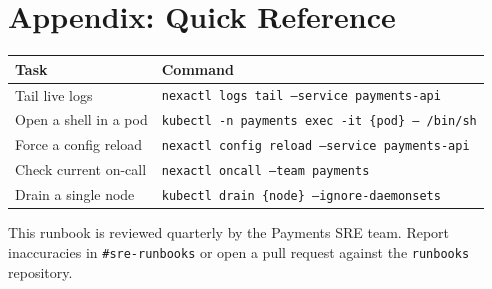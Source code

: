 \documentclass[11pt,a4paper,parskip=half]{scrartcl}
\begin{document}
\section{Appendix: Quick Reference}

\begin{tabularx}{\linewidth}{@{}l X@{}}
\toprule
\textbf{Task} & \textbf{Command} \\
\midrule
Tail live logs & \texttt{nexactl logs tail --service payments-api} \\
Open a shell in a pod & \texttt{kubectl -n payments exec -it \{pod\} -- /bin/sh} \\
Force a config reload & \texttt{nexactl config reload --service payments-api} \\
Check current on-call & \texttt{nexactl oncall --team payments} \\
Drain a single node & \texttt{kubectl drain \{node\} --ignore-daemonsets} \\
\bottomrule
\end{tabularx}

\vspace{6mm}
{\footnotesize\color{slate}
This runbook is reviewed quarterly by the Payments SRE team. Report inaccuracies
in \texttt{\#sre-runbooks} or open a pull request against the \texttt{runbooks} repository.
}
\end{document}
